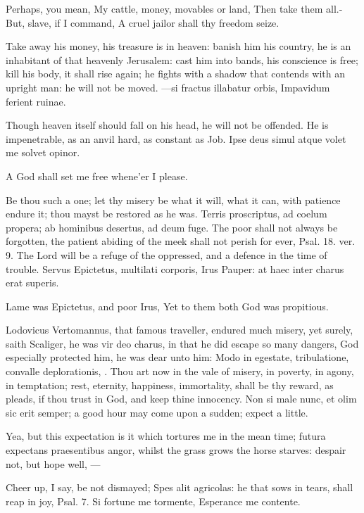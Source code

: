 {Perhaps, you mean,
My cattle, money, movables or land,
Then take them all.-But, slave, if I command,
A cruel jailor shall thy freedom seize.

Take away his money, his treasure is in heaven: banish him his
country, he is an inhabitant of that heavenly Jerusalem: cast him into
bands, his conscience is free; kill his body, it shall rise again; he
fights with a shadow that contends with an upright man: he will not be
moved.
---si fractus illabatur orbis,
Impavidum ferient ruinae.

Though heaven itself should fall on his head, he will not be offended.
He is impenetrable, as an anvil hard, as constant as Job.
Ipse deus simul atque volet me solvet opinor.

A God shall set me free whene'er I please.

Be thou such a one; let thy misery be what it will, what it can, with
patience endure it; thou mayst be restored as he was. Terris
proscriptus, ad coelum propera; ab hominibus desertus, ad deum fuge.
The poor shall not always be forgotten, the patient abiding of the meek
shall not perish for ever, Psal.  18. ver. 9. The Lord will be a
refuge of the oppressed, and a defence in the time of trouble.
Servus Epictetus, multilati corporis, Irus
Pauper: at haec inter charus erat superis.

Lame was Epictetus, and poor Irus,
Yet to them both God was propitious.

Lodovicus Vertomannus, that famous traveller, endured much misery, yet
surely, saith Scaliger, he was vir deo charus, in that he did escape so
many dangers, God especially protected him, he was dear unto him: Modo
in egestate, tribulatione, convalle deplorationis, \etc{}. Thou art now in
the vale of misery, in poverty, in agony, in temptation; rest,
eternity, happiness, immortality, shall be thy reward, as \Chrysostom
pleads, if thou trust in God, and keep thine innocency. Non si male
nunc, et olim sic erit semper; a good hour may come upon a sudden;
 expect a little.

Yea, but this expectation is it which tortures me in the mean time;
 futura expectans praesentibus angor, whilst the grass grows the
horse starves: despair not, but hope well,
---

Cheer up, I say, be not dismayed; Spes alit agricolas: he that sows in
tears, shall reap in joy, Psal.  7.
Si fortune me tormente,
Esperance me contente.

}
